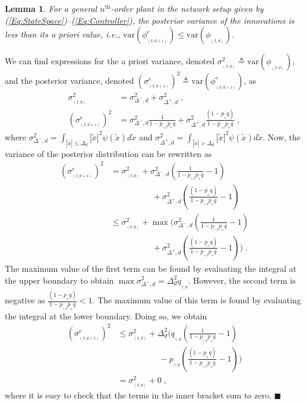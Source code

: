 \documentclass[twocolumn]{autart}
\newtheorem{lemma}[theorem]{Lemma}
\newenvironment{proof}[1][Proof]{\begin{trivlist}
\item[\hskip \labelsep {\bfseries #1}]}{\end{trivlist}}
\renewcommand{\qed}{$\blacksquare$}
\begin{document}
\begin{lemma} \label{Lemma:ReducedVariance}
For a general $n^{\textrm{th}}$-order plant in the network setup given by (\ref{Eq:StateSpace})--(\ref{Eq:Controller}), the posterior variance of the innovations is less than its a priori value, i.e., $\mathrm{var}(\phi^{e}_{_{(I,d+1)}}) \le \mathrm{var}(\phi_{_{(I,d)}})$.
\end{lemma}
\begin{proof}
We can find expressions for the a priori variance, denoted $\sigma^2_{_{(I,d)}} \triangleq \mathrm{var}(\phi_{_{(I,d)}})$, and the posterior variance, denoted  $(\sigma^{e}_{_{(I,d+1)}})^2 \triangleq \mathrm{var}(\phi^e_{_{(I,d+1)}})$, as
\begin{align*}
\sigma^2_{_{(I,d)}} &= \sigma^2_{\Delta^-,d} + \sigma^2_{\Delta^+,d} \; , \\
(\sigma^{e}_{_{(I,d+1)}})^2 &= \sigma^2_{\Delta^-,d} \frac{1}{1 - p_{_{\gamma,d}} p_{_{\alpha}} q} + \sigma^2_{\Delta^+,d} \frac{(1 - p_{_{\alpha}} q)}{1 - p_{_{\gamma,d}} p_{_{\alpha}} q} \; ,
\end{align*}
where $\sigma^2_{\Delta^-,d} = \int_{|\tilde{x}| \le \Delta_{d}} |\tilde{x}|^2 \psi(\tilde{x}) d \tilde{x}$ and $\sigma^2_{\Delta^+,d} = \int_{|\tilde{x}| > \Delta_{d}} |\tilde{x}|^2 \psi(\tilde{x}) d \tilde{x}$. Now, the variance of the posterior distribution can be rewritten as
\begin{align*}
(\sigma^{e}_{_{(I,d+1)}})^2 &= \sigma^2_{_{(I,d)}} + \sigma^2_{\Delta^-,d} \left( \frac{1}{1 - p_{_{\gamma,d}} p_{_{\alpha}} q} - 1 \right) \\
 &\quad \quad \quad \quad \quad + \sigma^2_{\Delta^+,d} \left( \frac{(1 - p_{_{\alpha}} q)}{1 - p_{_{\gamma,d}} p_{_{\alpha}} q} - 1\right) \\
&\le \sigma^2_{_{(I,d)}} + \max \bigg( \sigma^2_{\Delta^-,d} \left( \frac{1}{1 - p_{_{\gamma,d}} p_{_{\alpha}} q} - 1 \right)  \\
& \quad \quad \quad \quad \quad + \sigma^2_{\Delta^+,d} \left( \frac{(1 - p_{_{\alpha}} q)}{1 - p_{_{\gamma,d}} p_{_{\alpha}} q} - 1\right) \bigg) \; .
\end{align*}
The maximum value of the first term can be found by evaluating the integral at the upper boundary to obtain $\max \sigma^2_{\Delta^-,d} = \Delta_d^2 q_{_{\gamma,d}}$. However, the second term is negative as $\frac{(1 - p_{_{\alpha}} q)}{1 - p_{_{\gamma,d}} p_{_{\alpha}} q} < 1$. The maximum value of this term is found by evaluating the integral at the lower boundary. Doing so, we obtain
\begin{align*}
(\sigma^{e}_{_{(I,d+1)}})^2 &\le \sigma^2_{_{(I,d)}} + \Delta_d^2 \bigg( q_{_{\gamma,d}} \left( \frac{1}{1 - p_{_{\gamma,d}} p_{_{\alpha}} q} - 1 \right) \\
&\quad \quad \quad \quad \quad - p_{_{\gamma,d}} \left( \frac{(1 - p_{_{\alpha}} q)}{1 - p_{_{\gamma,d}} p_{_{\alpha}} q} - 1\right) \bigg) \\
&= \sigma^2_{_{(I,d)}} + 0 \; ,
\end{align*}
where it is easy to check that the terms in the inner bracket sum to zero. \hfill \qed
\end{proof}
\end{document}
